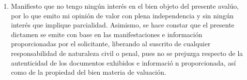 \begin{enumerate}[\indent a)]
\item Manifiesto que no tengo ning\'un inter\'es en el bien objeto del presente aval\'uo, por lo que emito mi opini\'on de valor con plena independencia y sin ning\'un inter\'es que implique parcialidad.
Asimismo, se hace constar que el presente dictamen se emite con base en las manifestaciones e informaci\'on proporcionadas por el solicitante, liberando al suscrito de cualquier responsabilidad de naturaleza civil o penal, pues no se prejuzga respecto de la autenticidad de los documentos exhibidos e informaci\'o n proporcionada, as\'i como de la propiedad del bien materia de valuaci\'on.


\end{enumerate}